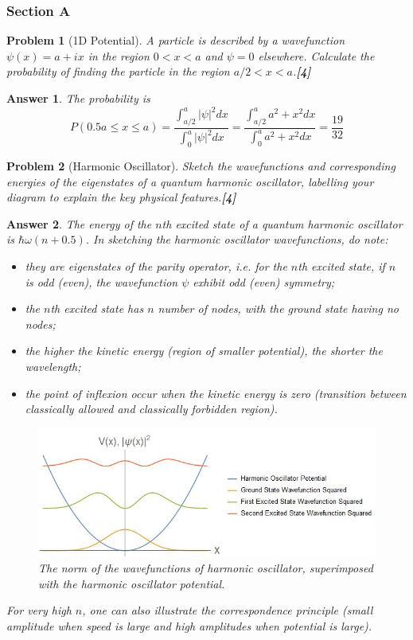 \documentclass[a4paper]{article}
\newtheorem{ans}{Answer}[subsection]
\theoremstyle{new}
\newtheorem{qns}{Problem}[subsection]
\begin{document}
\subsubsection{Section A}
\begin{qns}[1D Potential]
A particle is described by a wavefunction $\psi(x)=a+ix$ in the region $0<x<a$ and $\psi=0$ elsewhere. Calculate the probability of finding the particle in the region $a/2<x<a$.\hfill\textbf{[4]}
\end{qns}
\begin{ans}
The probability is
$$P(0.5a\leq x\leq a)=\frac{\int_{a/2}^a|\psi|^2dx}{\int_0^a|\psi|^2dx}=\frac{\int_{a/2}^aa^2+x^2dx}{\int_0^aa^2+x^2dx}=\frac{19}{32}$$
\end{ans}
\begin{qns}[Harmonic Oscillator]
Sketch the wavefunctions and corresponding energies of the eigenstates of a quantum harmonic oscillator, labelling your diagram to explain the key physical features.\hfill\textbf{[4]}
\end{qns}
\begin{ans}
The energy of the $n$th excited state of a quantum harmonic oscillator is $\hbar\omega(n+0.5)$. In sketching the harmonic oscillator wavefunctions, do note:
\begin{itemize}
    \item they are eigenstates of the parity operator, i.e. for the $n$th excited state, if $n$ is odd (even), the wavefunction $\psi$ exhibit odd (even) symmetry;
    \item the $n$th excited state has $n$ number of nodes, with the ground state having no nodes;
    \item the higher the kinetic energy (region of smaller potential), the shorter the wavelength;
    \item the point of inflexion occur when the kinetic energy is zero (transition between classically allowed and classically forbidden region).
\end{itemize}
\begin{figure}[H]
    \centering
    \includegraphics[width=\linewidth]{2015P1A2.JPG}
    \caption{The norm of the wavefunctions of harmonic oscillator, superimposed with the harmonic oscillator potential.}
\end{figure}
For very high $n$, one can also illustrate the correspondence principle (small amplitude when speed is large and high amplitudes when potential is large).
\end{ans}
\end{document}
